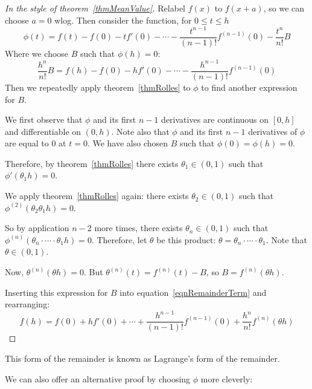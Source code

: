 \documentclass[../Main.tex]{subfiles}
\begin{document}
\begin{proof}[In the style of theorem~\ref{thmMeanValue}]
    Relabel $f(x)$ to $f(x + a)$, so we can choose $a = 0$ wlog. Then consider the function, for $0 \leq t \leq h$
    \begin{equation*}
        \phi(t) = f(t) - f(0) - tf'(0) - \cdots - \frac{t^{n-1}}{(n-1)!} f^{(n-1)}(0) - \frac{t^n}{n!}B
    \end{equation*}
    Where we choose $B$ such that $\phi(h) = 0$:
    \begin{equation}
        \frac{h^n}{n!} B = f(h) - f(0) - hf'(0) - \cdots - \frac{h^{n-1}}{(n-1)!} f^{(n-1)}(0)
        \label{eqnRemainderTerm}
    \end{equation}
    Then we repeatedly apply theorem~\ref{thmRolles} to $\phi$ to find another expression for $B$.\par
    We first observe that $\phi$ and its first $n - 1$ derivatives are continuous on $[0, h]$ and differentiable on $(0, h)$. Note also that $\phi$ and its first $n - 1$ derivatives of $\phi$ are equal to $0$ at $t = 0$. We have also chosen $B$ such that $\phi(0) = \phi(h) = 0$.\par
    Therefore, by theorem~\ref{thmRolles} there exists $\theta_1 \in (0, 1)$ such that $\phi'(\theta_1h) = 0$.\par
    We apply theorem~\ref{thmRolles} again: there exists $\theta_2 \in (0, 1)$ such that $\phi^{(2)}(\theta_2\theta_1h) = 0$.\par
    So by application $n-2$ more times, there exists $\theta_n \in (0, 1)$ such that $\phi^{(n)}(\theta_n \cdot \cdots \cdot \theta_1h) = 0$. Therefore, let $\theta$ be this product: $\theta = \theta_n \cdot \cdots \cdot \theta_1$. Note that $\theta \in (0, 1)$.\par
    Now, $\theta^{(n)}(\theta h) = 0$. But $\theta^{(n)}(t) = f^{(n)}(t) - B$, so $B = f^{(n)}(\theta h)$.\par
    Inserting this expression for $B$ into equation~\ref{eqnRemainderTerm} and rearranging:
    \begin{equation*}
        f(h) = f(0) + hf'(0) + \cdots + \frac{h^{n-1}}{(n-1)!}f^{(n-1)}(0) + \frac{h^n}{n!} f^{(n)}(\theta h)
    \end{equation*}
\end{proof}
\begin{remark}
    This form of the remainder is known as Lagrange's form of the remainder.
\end{remark}
We can also offer an alternative proof by choosing $\phi$ more cleverly:
\end{document}
